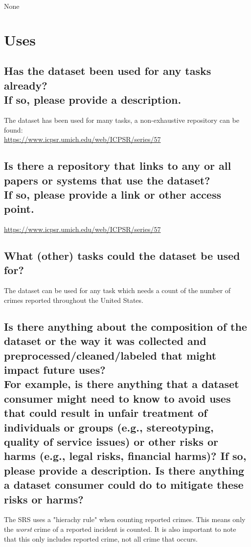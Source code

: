 \documentclass[letterpaper, 10 pt, conference]{ieeeconf}  %
\newcommand{\subtitle}[1]{{\\ \small \normalfont \color{purple} #1}}
\begin{document}
None

\section{Uses}

\subsection{Has the dataset been used for any tasks already? \subtitle{If so, please provide a description.}}

The dataset has been used for many tasks, a non-exhaustive repository can be found: \\

\href{https://www.icpsr.umich.edu/web/ICPSR/series/57}{https://www.icpsr.umich.edu/web/ICPSR/series/57}

\subsection{Is there a repository that links to any or all papers or systems that use the dataset? \subtitle{If so, please provide a link or other access point. }}

\href{https://www.icpsr.umich.edu/web/ICPSR/series/57}{https://www.icpsr.umich.edu/web/ICPSR/series/57}

\subsection{What (other) tasks could the dataset be used for?}

The dataset can be used for any task which needs a count of the number of crimes reported throughout the United States. 

\subsection{Is there anything about the composition of the dataset or the way it was collected and preprocessed/cleaned/labeled that might impact future uses? \subtitle{For example, is there anything that a dataset consumer might need to know to avoid uses that could result in unfair treatment of individuals or groups (e.g., stereotyping, quality of service issues) or other risks or harms (e.g., legal risks, financial harms)? If so, please provide a description. Is there anything a dataset consumer could do to mitigate these risks or harms?}}

The SRS uses a "hierachy rule" when counting reported crimes. This means only the \textit{worst} crime of a reported incident is counted. It is also important to note that this only includes reported crime, not all crime that occurs.
\end{document}
